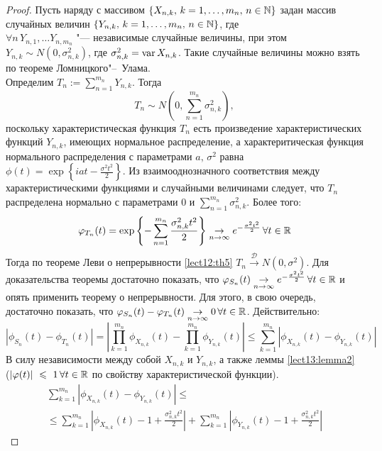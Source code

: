 \begin{proof}
Пусть наряду с массивом $\{X_{n, k}, \,k = 1, \ldots, m_n, \, n \in \mathbb{N}\}$ задан массив случайных величин $\{Y_{n, k}, \,k = 1, \ldots, m_n, \, n \in \mathbb{N}\}$, где\\ $\forall n\, Y_{n, 1}, \ldots Y_{n, m_n}$ "--- независимые случайные величины, при этом \\$Y_{n, k} \sim N(0, \sigma_{n, k}^2)$, где $\sigma_{n, k}^2 = \operatorname*{var} X_{n, k}$. Такие случайные величины можно взять по теореме Ломницкого"--~Улама.\\ Определим $T_n := \sum\limits_{n = 1}^{m_n} Y_{n, k}$. Тогда 
$$
T_n \sim N(0, \sum\limits_{n = 1}^{m_n}\sigma_{n, k}^2),
$$ поскольку характеристическая функция $T_n$ есть произведение характеристических функций $Y_{n, k}$, имеющих нормальное распределение, а характеритическая функция нормального распределения с параметрами $a,\, \sigma^2$ равна $\phi(t) = \exp\left\{iat - \frac{\sigma^2t^2}{2}\right\}$. Из взаимооднозначного соответствия между характеристическими функциями и случайными величинами следует, что $T_n$ распределена нормально с параметрами $0$ и $\sum\limits_{n = 1}^{m_n}\sigma_{n, k}^2$.
Более того:
$$
\varphi_{T_n}(t) = \exp\left\{-\sum\limits_{n = 1}^{m_n}\frac{\sigma_{n, k}^2t^2}{2}\right\} \underset{n \to \infty}{\to} e^{-\frac{\sigma^2t^2}{2}} \, \forall t \in \mathbb{R}
$$
Тогда по теореме Леви о непрерывности \ref{lect12:th5} $T_n \overset{\mathcal{D}}{\to} N(0, \sigma^2)$. Для доказательства теоремы достаточно показать, что $\varphi_{S_n}(t) \underset{n \to \infty}{\to} e^{-\frac{\sigma^2t^2}{2}} \, \forall t \in \mathbb{R}$ и опять применить теорему о непрерывности. Для этого, в свою очередь, достаточно показать, что $\varphi_{S_n}(t) - \varphi_{T_n}(t) \underset{n \to \infty}{\to} 0\,\forall t \in \mathbb{R}$. Действительно:
$$
\left|\phi_{S_n}(t) - \phi_{T_n}(t)\right| = \left|\prod_{k = 1}^{m_n}\phi_{X_{n, k}}(t) -\prod_{k = 1}^{m_n}\phi_{Y_{n, k}}(t) \right| \leqslant \sum_{k = 1}^{m_n}\left|\phi_{X_{n, k}}(t) - \phi_{Y_{n, k}}(t)\right|
$$
В силу независимости между собой $X_{n, k}$ и $Y_{n, k}$, а также леммы \ref{lect13:lemma2} \\($\left|\varphi(t)\right|~\leqslant~1 \, \forall t \in \mathbb{R}$ по свойству характеристической функции).
\begin{multline*}
\sum_{k = 1}^{m_n}\left|\phi_{X_{n, k}}(t) - \phi_{Y_{n, k}}(t)\right| \leqslant
\\
\leqslant \sum_{k = 1}^{m_n}\left|\phi_{X_{n, k}}(t) - 1 + \frac{\sigma_{n, k}^2t^2}{2}\right| + \sum_{k = 1}^{m_n}\left|\phi_{Y_{n, k}}(t)  - 1 + \frac{\sigma_{n, k}^2t^2}{2}\right|

\end{multline*}
\end{proof}
